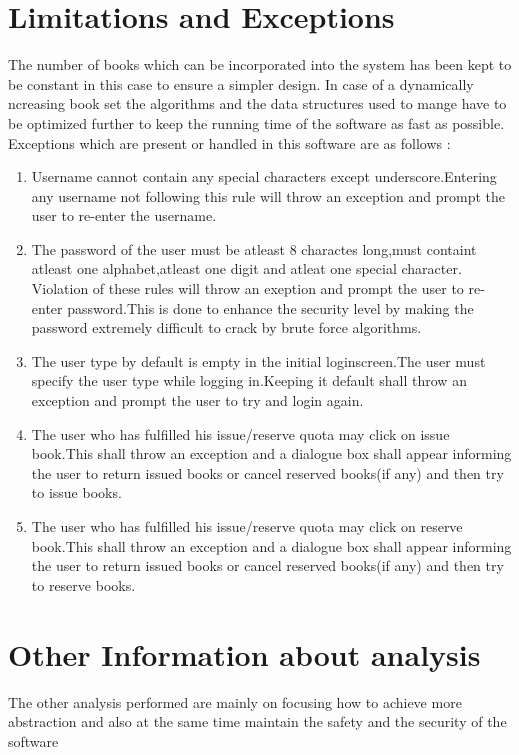 \documentclass{article}
\begin{document}
\section{Limitations and Exceptions}
The number of books which can be incorporated into the system has been kept to be constant in this case to ensure a simpler design.
In case of a dynamically ncreasing book set the algorithms and the data structures used to mange have to be optimized further to keep the running time of the software as fast as possible.
\\
Exceptions which are present or handled in this software are as follows :
\begin{enumerate}
\item Username cannot contain any special characters except underscore.Entering any username not following this rule will throw an exception and prompt the user to re-enter the username.
\item The password of the user must be atleast 8 charactes long,must containt atleast one alphabet,atleast one digit and atleat one special character. Violation of these rules will throw an exeption and prompt the user to re-enter password.This is done to enhance the security level by making the password extremely difficult to crack by brute force algorithms.
\item The user type by default is empty in the initial  loginscreen.The user must specify the user type while logging in.Keeping it default shall throw an exception and prompt the user to try and login again.
\item The user who has fulfilled his issue/reserve quota may click on issue book.This shall throw an exception and a dialogue box shall appear informing the user to return issued books or cancel reserved books(if any) and then try to issue books.
\item The user who has fulfilled his issue/reserve quota may click on reserve book.This shall throw an exception and a dialogue box shall appear informing the user to return issued books or cancel reserved books(if any) and then try to reserve books.
   
\end{enumerate}
\section{Other Information about analysis}
The other analysis performed are mainly on focusing how to achieve more abstraction and also at the same time maintain the safety and the security of the software
\end{document}
